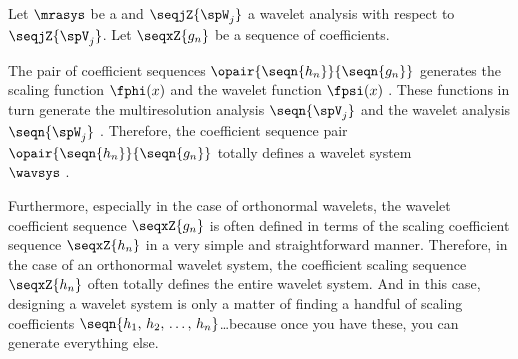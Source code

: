 \begin{definition}
\label{def:wavsys}
\label{def:gn}
Let $\mrasys$ be a  
and $\seqjZ{\spW_j}$ a wavelet analysis 
with respect to $\seqjZ{\spV_j}$.
Let $\seqxZ{g_n}$ be a sequence of coefficients.
\end{definition}

\begin{remark}
The pair of coefficient sequences $\opair{\seqn{h_n}}{\seqn{g_n}}$ generates 
the scaling function $\fphi(x)$  
and the wavelet function $\fpsi(x)$ .
These functions in turn generate 
the multiresolution analysis $\seqn{\spV_j}$ 
and the wavelet analysis $\seqn{\spW_j}$ .
Therefore, the coefficient sequence pair $\opair{\seqn{h_n}}{\seqn{g_n}}$ 
totally defines a wavelet system\\$\wavsys$ .

Furthermore, especially in the case of orthonormal wavelets, the wavelet coefficient
sequence $\seqxZ{g_n}$ is often defined in terms of the 
scaling coefficient sequence $\seqxZ{h_n}$
in a very simple and straightforward manner.
Therefore, in the case of an orthonormal wavelet system, the coefficient
scaling sequence $\seqxZ{h_n}$ often totally defines the entire wavelet system.
And in this case, designing a wavelet system is only a matter of finding a handful of
scaling coefficients $\seqn{h_1,\,h_2,\,\ldots,\,h_n}$\ldots because once you have these,
you can generate everything else.
\end{remark}






